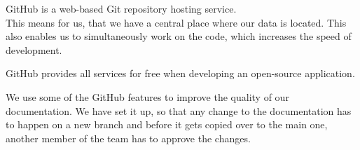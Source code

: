 GitHub is a web-based Git repository hosting service. \cite{github} \\
This means for us, that we have a central place where our data is located. This also enables us to simultaneously work on the code, which increases the speed of development.  

GitHub provides all services for free when developing an open-source application. \cite{githubprice}  

We use some of the GitHub features to improve the quality of our documentation. We have set it up, so that any change to the documentation has to happen on a new branch and before it gets copied over to the main one, another member of the team has to approve the changes. \cite{githubreviews}

